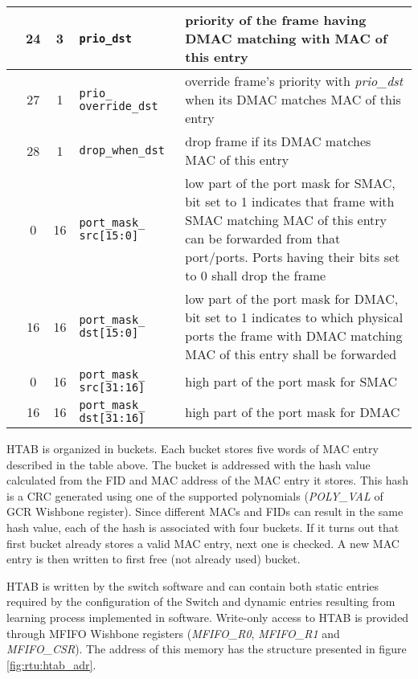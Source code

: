 {\begin{tabular}{|>{\centering\arraybackslash}p{1cm}|c|c|p{3cm}|p{8cm}|}
  \cline{2-5}
  & 24 & 3 & \texttt{prio\_dst} & priority of the frame having DMAC matching with MAC 
  of this entry\\
  \cline{2-5}
  & 27 & 1 & \texttt{prio\_ \linebreak override\_dst} & override frame's priority with
  \emph{prio\_dst} when its DMAC matches MAC of this entry\\
  \cline{2-5}
  & 28 & 1 & \texttt{drop\_when\_dst} & drop frame if its DMAC matches MAC of this
  entry\\
  \hline \hline
  \multirow{10}{*}{3} & 0 & 16 & \texttt{port\_mask\_ \linebreak src[15:0]} &
  low part of the port mask for SMAC, bit set
  to 1 indicates that frame with SMAC matching MAC of this entry can be
  forwarded from that port/ports. Ports having their bits set to 0 shall drop
  the frame\\
  \cline{2-5}
  & 16 & 16 & \texttt{port\_mask\_ \linebreak dst[15:0]} & low part of the port mask for DMAC, bit set
  to 1 indicates to which physical ports the frame with DMAC matching MAC of
  this entry shall be forwarded\\
  \hline \hline
  \multirow{4}{*}{4} & 0 & 16 & \texttt{port\_mask\_ \linebreak src[31:16]} &
  high part of the port mask for SMAC\\
  \cline{2-5}
  & 16 & 16 & \texttt{port\_mask\_ \linebreak dst[31:16]} & high part of the port mask for DMAC\\
  \hline
\end{tabular}
}

\vspace{12pt}
HTAB is organized in buckets. Each bucket stores five words of MAC entry
described in the table above. The bucket is addressed with the hash value
calculated from the FID and MAC address of the MAC entry it stores. This hash is
a CRC generated using one of the supported polynomials (\emph{POLY\_VAL} of GCR
Wishbone register). Since different MACs and FIDs can result in the same hash
value, each of the hash is associated with four buckets. If it turns out that
first bucket already stores a valid MAC entry, next one is checked. A new MAC
entry is then written to first free (not already used) bucket.

HTAB is written by the switch software and can contain both static entries
required by the configuration of the Switch and dynamic entries resulting from
learning process implemented in software. Write-only access to HTAB is provided
through MFIFO Wishbone registers (\emph{MFIFO\_R0}, \emph{MFIFO\_R1} and
\emph{MFIFO\_CSR}). The address of this memory has the structure presented in
figure \ref{fig:rtu:htab_adr}.

